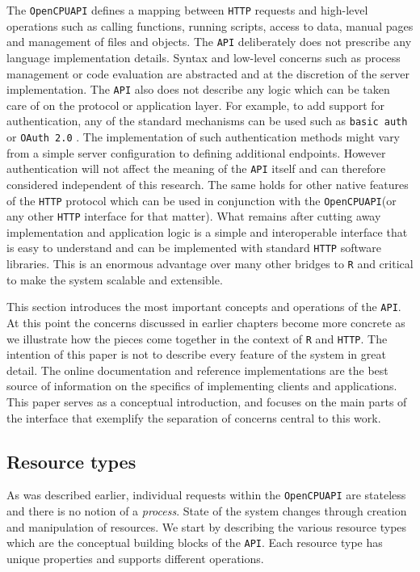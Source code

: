 \documentclass{article}
\newcommand{\R}{\texttt{R}\xspace}
\newcommand{\HTTP}{\texttt{HTTP}\xspace}
\newcommand{\API}{\texttt{API}\xspace}
\newcommand{\OpenCPU}{\texttt{OpenCPU}\xspace}
\begin{document}
The \OpenCPU \API defines a mapping between \HTTP requests and high-level operations such as calling functions, running scripts, access to data, manual pages and management of files and objects. The \API deliberately does not prescribe any language implementation details. Syntax and low-level concerns such as process management or code evaluation are abstracted and at the discretion of the server implementation. The \API also does not describe any logic which can be taken care of on the protocol or application layer. For example, to add support for authentication, any of the standard mechanisms can be used such as \texttt{basic auth} \citep{franks1999rfc} or \texttt{OAuth 2.0} \citep{hardt2012oauth}. The implementation of such authentication methods might vary from a simple server configuration to defining additional endpoints. However authentication will not affect the meaning of the \API itself and can therefore considered independent of this research. The same holds for other native features of the \HTTP protocol which can be used in conjunction with the \OpenCPU \API (or any other \HTTP interface for that matter). What remains after cutting away implementation and application logic is a simple and interoperable interface that is easy to understand and can be implemented with standard \HTTP software libraries. This is an enormous advantage over many other bridges to \R and critical to make the system scalable and extensible. 

This section introduces the most important concepts and operations of the \API. At this point the concerns discussed in earlier chapters become more concrete as we illustrate how the pieces come together in the context of \R and \HTTP. The intention of this paper is not to describe every feature of the system in great detail. The online documentation and reference implementations are the best source of information on the specifics of implementing clients and applications. This paper serves as a conceptual introduction, and focuses on the main parts of the interface that exemplify the separation of concerns central to this work. 

\subsection{Resource types}

As was described earlier, individual requests within the \OpenCPU \API are stateless and there is no notion of a \emph{process}. State of the system changes through creation and manipulation of resources. We start by describing the various resource types which are the conceptual building blocks of the \API. Each resource type has unique properties and supports different operations.
\end{document}
